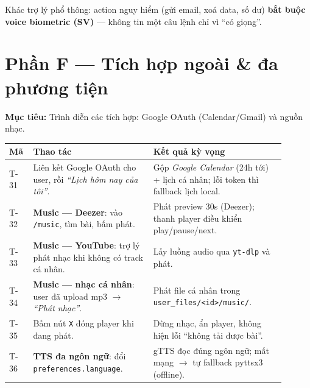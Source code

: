 \documentclass[12pt,a4paper]{article}
\newcommand{\role}[1]{\par\smallskip\noindent\textbf{\textcolor{hdr}{Mục tiêu:}} #1\par\smallskip}
\newcommand{\say}[1]{\textit{``#1''}}
\begin{document}
\begin{diembox}
Khác trợ lý phổ thông: action nguy hiểm (gửi email, xoá data, số dư) \textbf{bắt
buộc voice biometric (SV)} --- không tin một câu lệnh chỉ vì ``có giọng''.
\end{diembox}

\section{Phần F --- Tích hợp ngoài \& đa phương tiện}
\role{Trình diễn các tích hợp: Google OAuth (Calendar/Gmail) và nguồn nhạc.}

\begin{table}[H]
\centering\small
\begin{tabular}{p{0.06\linewidth}p{0.40\linewidth}p{0.44\linewidth}}
\toprule
\textbf{Mã} & \textbf{Thao tác} & \textbf{Kết quả kỳ vọng} \\
\midrule
T-31 & Liên kết Google OAuth cho user, rồi \say{Lịch hôm nay của tôi}. & Gộp
\emph{Google Calendar} (24h tới) + lịch cá nhân; lỗi token thì fallback lịch local. \\
T-32 & \textbf{Music --- Deezer}: vào \texttt{/music}, tìm bài, bấm phát. & Phát
preview 30s (Deezer); thanh player điều khiển play/pause/next. \\
T-33 & \textbf{Music --- YouTube}: trợ lý phát nhạc khi không có track cá nhân. &
Lấy luồng audio qua \texttt{yt-dlp} và phát. \\
T-34 & \textbf{Music --- nhạc cá nhân}: user đã upload mp3 $\to$ \say{Phát nhạc}. &
Phát file cá nhân trong \texttt{user\_files/<id>/music/}. \\
T-35 & Bấm nút \texttt{X} đóng player khi đang phát. & Dừng nhạc, ẩn player, không
hiện lỗi ``không tải được bài''. \\
T-36 & \textbf{TTS đa ngôn ngữ}: đổi \texttt{preferences.language}. & gTTS đọc đúng
ngôn ngữ; mất mạng $\to$ tự fallback pyttsx3 (offline). \\
\bottomrule
\end{tabular}
\end{table}

\end{document}
